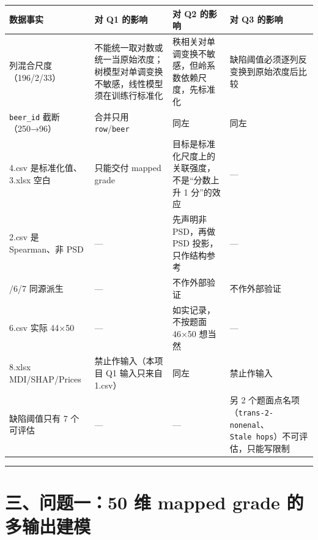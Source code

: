 \documentclass[
  11pt,
]{ctexart}
\newcounter{none} %
\begin{document}
{\def\LTcaptype{none} %
\begin{longtable}[]{@{}
  >{\raggedright\arraybackslash}p{}
  >{\raggedright\arraybackslash}p{}
  >{\raggedright\arraybackslash}p{}
  >{\raggedright\arraybackslash}p{}@{}}
\toprule\noalign{}
\begin{minipage}[b]{\linewidth}\raggedright
数据事实
\end{minipage} & \begin{minipage}[b]{\linewidth}\raggedright
对 Q1 的影响
\end{minipage} & \begin{minipage}[b]{\linewidth}\raggedright
对 Q2 的影响
\end{minipage} & \begin{minipage}[b]{\linewidth}\raggedright
对 Q3 的影响
\end{minipage} \\
\midrule\noalign{}
\endhead
\bottomrule\noalign{}
\endlastfoot
231 列混合尺度（196/2/33） &
不能统一取对数或统一当原始浓度；树模型对单调变换不敏感，线性模型须在训练行标准化
& 秩相关对单调变换不敏感，但岭系数依赖尺度，先标准化 &
缺陷阈值必须逐列反变换到原始浓度后比较 \\
\texttt{beer\_id} 截断（250→96） & 合并只用 \texttt{row}/\texttt{beer} &
同左 & 同左 \\
4.csv 是标准化值、3.xlsx 空白 & 只能交付 mapped grade &
目标是标准化尺度上的关联强度，不是``分数上升 1 分''的效应 & --- \\
2.csv 是 Spearman、非 PSD & --- & 先声明非 PSD，再做 PSD
投影，只作结构参考 & --- \\
5/6/7 同源派生 & --- & 不作外部验证 & 不作外部验证 \\
6.csv 实际 44×50 & --- & 如实记录，不按题面 46×50 想当然 & --- \\
8.xlsx MDI/SHAP/Prices & 禁止作输入（本项目 Q1 输入只来自 1.csv） & 同左
& 禁止作输入 \\
缺陷阈值只有 7 个可评估 & --- & --- & 另 2
个题面点名项（\texttt{trans-2-nonenal}、\texttt{Stale\ hops}）不可评估，只能写限制 \\
\end{longtable}
}

\begin{center}\rule{0.5\linewidth}{0.5pt}\end{center}

\section{三、问题一：50 维 mapped grade
的多输出建模}\label{ux4e09ux95eeux9898ux4e0050-ux7ef4-mapped-grade-ux7684ux591aux8f93ux51faux5efaux6a21}
\end{document}
